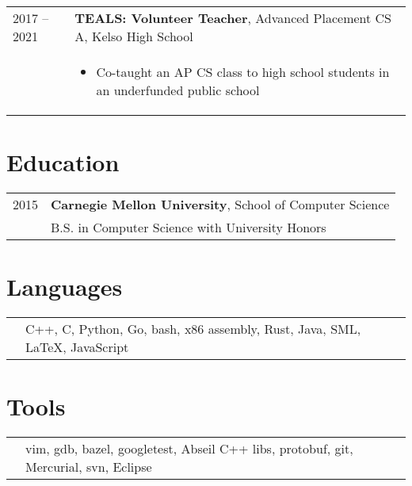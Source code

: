 \documentclass[overlapped]{res} \usepackage{hyperref}
\newcommand{\experience}[5]{
  \hspace{-9ex}
  \begin{tabular}{m{12ex} m{\textwidth}}
    #1 -- #2 & \textbf{#3}, #4 \\
    & #5
  \end{tabular}
  \vspace{-3ex}
}
\newcommand{\education}[4]{
  \hspace{-9ex}
  \begin{tabular}{m{12ex} m{\textwidth}}
    \hfill #1 & \textbf{#2}, #3 \\
    & #4
  \end{tabular}
  \vspace{-3ex}
}
\newcommand{\skills}[1]{
  \hspace{-9ex}
  \begin{tabular}{m{12ex} m{\textwidth}}
    & #1
  \end{tabular}
  \vspace{-4ex}
}
\begin{document}
\begin{resume}
  \experience{2017}{2021}{TEALS: Volunteer Teacher}{Advanced Placement CS A, Kelso High School}{
    \begin{itemize} \itemsep -1pt
      \item Co-taught an AP CS class to high school students in an
        underfunded public school
    \end{itemize}
  }

\section{Education}
  \vspace{0.5ex}

  \education{2015}{Carnegie Mellon University}{School of Computer Science}
  {B.S. in Computer Science with University Honors}

\section{Languages}
  \skills{C++, C, Python, Go, bash, x86 assembly, Rust, Java, SML, \LaTeX, JavaScript}

\section{Tools}
  \skills{vim, gdb, bazel, googletest, Abseil C++ libs, protobuf, git, Mercurial, svn, Eclipse}

\end{resume}
\end{document}
